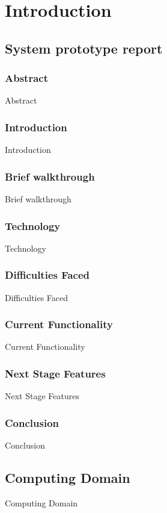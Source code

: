 \part{Introduction}

\chapter{System prototype report}

\section{Abstract}
Abstract

\section{Introduction}
Introduction

\section{Brief walkthrough}
Brief walkthrough

\section{Technology}
Technology

\section{Difficulties Faced}
Difficulties Faced

\section{Current Functionality}
Current Functionality

\section{Next Stage Features}
Next Stage Features

\section{Conclusion}
Conclusion

\chapter{Computing Domain}
Computing Domain

